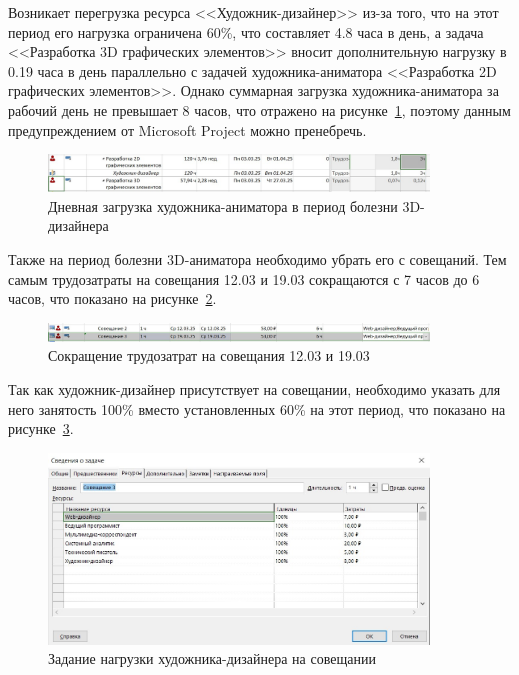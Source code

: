 Возникает перегрузка ресурса <<Художник-дизайнер>> из-за того, что на этот период его нагрузка ограничена 60\%, что составляет 4.8 часа в день, а задача <<Разработка 3D графических элементов>> вносит дополнительную нагрузку в 0.19 часа в день параллельно с задачей художника-аниматора <<Разработка 2D графических элементов>>.
Однако суммарная загрузка художника-аниматора за рабочий день не превышает 8 часов, что отражено на рисунке~\ref{fig:screen6}, поэтому данным предупреждением от Microsoft Project можно пренебречь.

\begin{figure}[H]
	\centering
	\includegraphics[width=0.9\textwidth]{img/screen6.jpg}
	\caption{Дневная загрузка художника-аниматора в период болезни 3D-дизайнера}
	\label{fig:screen6}
\end{figure}

Также на период болезни 3D-аниматора необходимо убрать его с совещаний.
Тем самым трудозатраты на совещания 12.03 и 19.03 сокращаются с 7 часов до 6 часов, что показано на рисунке~\ref{fig:screen7}.

\begin{figure}[H]
	\centering
	\includegraphics[width=0.9\textwidth]{img/screen7.jpg}
	\caption{Сокращение трудозатрат на совещания 12.03 и 19.03}
	\label{fig:screen7}
\end{figure}

Так как художник-дизайнер присутствует на совещании, необходимо указать для него занятость 100\% вместо установленных 60\% на этот период, что показано на рисунке~\ref{fig:screen8}.

\begin{figure}[H]
	\centering
	\includegraphics[width=0.9\textwidth]{img/screen8.jpg}
	\caption{Задание нагрузки художника-дизайнера на совещании}
	\label{fig:screen8}
\end{figure}

